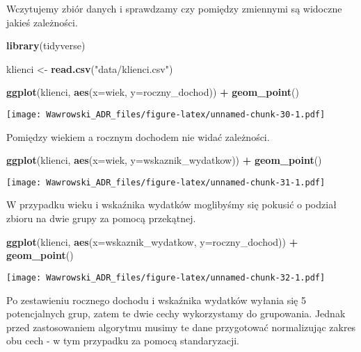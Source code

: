 \documentclass[]{book}
\newenvironment{Shaded}{\begin{snugshade}}{\end{snugshade}}
\newcommand{\KeywordTok}[1]{\textcolor[rgb]{0.13,0.29,0.53}{\textbf{#1}}}
\newcommand{\DataTypeTok}[1]{\textcolor[rgb]{0.13,0.29,0.53}{#1}}
\newcommand{\StringTok}[1]{\textcolor[rgb]{0.31,0.60,0.02}{#1}}
\newcommand{\OperatorTok}[1]{\textcolor[rgb]{0.81,0.36,0.00}{\textbf{#1}}}
\newcommand{\NormalTok}[1]{#1}
\begin{document}
Wczytujemy zbiór danych i sprawdzamy czy pomiędzy zmiennymi są widoczne
jakieś zależności.

\begin{Shaded}
\begin{Highlighting}[]
\KeywordTok{library}\NormalTok{(tidyverse)}

\NormalTok{klienci <-}\StringTok{ }\KeywordTok{read.csv}\NormalTok{(}\StringTok{"data/klienci.csv"}\NormalTok{)}

\KeywordTok{ggplot}\NormalTok{(klienci, }\KeywordTok{aes}\NormalTok{(}\DataTypeTok{x=}\NormalTok{wiek, }\DataTypeTok{y=}\NormalTok{roczny_dochod)) }\OperatorTok{+}
\StringTok{  }\KeywordTok{geom_point}\NormalTok{()}
\end{Highlighting}
\end{Shaded}

\texttt{[image: Wawrowski\_ADR\_files/figure-latex/unnamed-chunk-30-1.pdf]}

Pomiędzy wiekiem a rocznym dochodem nie widać zależności.

\begin{Shaded}
\begin{Highlighting}[]
\KeywordTok{ggplot}\NormalTok{(klienci, }\KeywordTok{aes}\NormalTok{(}\DataTypeTok{x=}\NormalTok{wiek, }\DataTypeTok{y=}\NormalTok{wskaznik_wydatkow)) }\OperatorTok{+}
\StringTok{  }\KeywordTok{geom_point}\NormalTok{()}
\end{Highlighting}
\end{Shaded}

\texttt{[image: Wawrowski\_ADR\_files/figure-latex/unnamed-chunk-31-1.pdf]}

W przypadku wieku i wskaźnika wydatków moglibyśmy się pokusić o podział
zbioru na dwie grupy za pomocą przekątnej.

\begin{Shaded}
\begin{Highlighting}[]
\KeywordTok{ggplot}\NormalTok{(klienci, }\KeywordTok{aes}\NormalTok{(}\DataTypeTok{x=}\NormalTok{wskaznik_wydatkow, }\DataTypeTok{y=}\NormalTok{roczny_dochod)) }\OperatorTok{+}
\StringTok{  }\KeywordTok{geom_point}\NormalTok{()}
\end{Highlighting}
\end{Shaded}

\texttt{[image: Wawrowski\_ADR\_files/figure-latex/unnamed-chunk-32-1.pdf]}

Po zestawieniu rocznego dochodu i wskaźnika wydatków wyłania się 5
potencjalnych grup, zatem te dwie cechy wykorzystamy do grupowania.
Jednak przed zastosowaniem algorytmu musimy te dane przygotować
normalizując zakres obu cech - w tym przypadku za pomocą standaryzacji.
\end{document}
